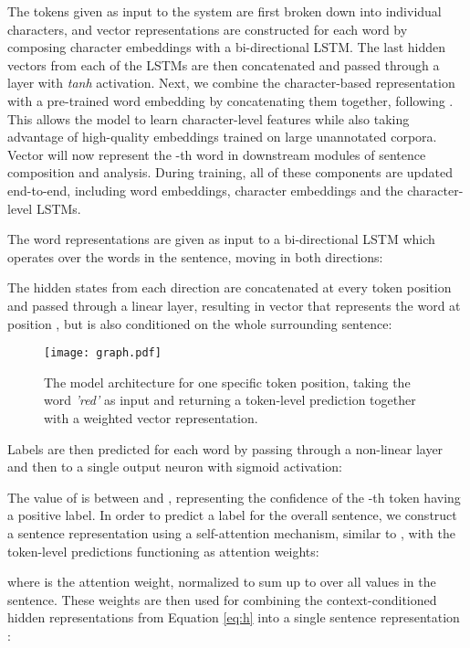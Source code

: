 \documentclass[letterpaper]{article} \usepackage{aaai19}  \usepackage{times}  \usepackage{helvet}  \usepackage{courier}  \usepackage{graphicx}
\begin{document}
The tokens given as input to the system are first broken down into individual characters, and vector representations are constructed for each word by composing character embeddings with a bi-directional LSTM.
The last hidden vectors from each of the LSTMs are then concatenated and passed through a layer with \textit{tanh} activation.
Next, we combine the character-based representation  with a pre-trained word embedding  by concatenating them together, following \citet{Lample2016}.
This allows the model to learn character-level features while also taking advantage of high-quality embeddings trained on large unannotated corpora.
Vector  will now represent the -th word in downstream modules of sentence composition and analysis. 
During training, all of these components are updated end-to-end, including word embeddings, character embeddings and the character-level LSTMs.

The word representations  are given as input to a bi-directional LSTM which operates over the words in the sentence, moving in both directions:


\noindent The hidden states from each direction are concatenated at every token position and passed through a linear layer, resulting in vector  that represents the word at position , but is also conditioned on the whole surrounding sentence:





\begin{figure}[t]
	\centering
	\texttt{[image: graph.pdf]}
	\caption{The model architecture for one specific token position, taking the word \textit{'red'} as input and returning a token-level prediction  together with a weighted vector representation.}
	\label{fig:network}
\end{figure}




Labels are then predicted for each word by passing  through a non-linear layer and then to a single output neuron with sigmoid activation:


The value of  is between  and , representing the confidence of the -th token having a positive label.
In order to predict a label for the overall sentence, we construct a sentence representation using a self-attention mechanism, similar to \citet{Yang2016a}, with the token-level predictions functioning as attention weights:


\noindent where  is the attention weight, normalized to sum up to  over all values in the sentence. 
These weights are then used for combining the context-conditioned hidden representations from Equation \ref{eq:h} into a single sentence representation :
\end{document}

